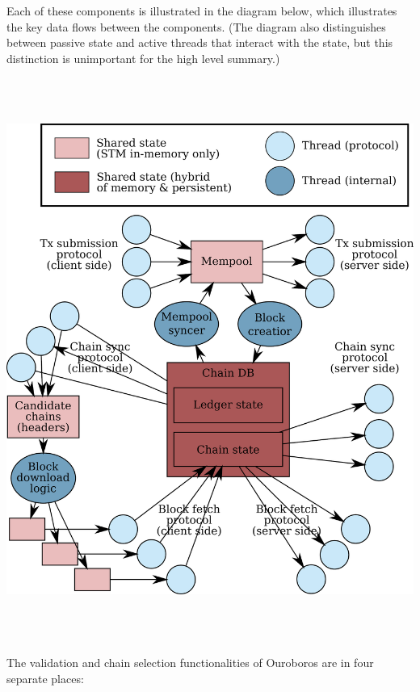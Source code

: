 \documentclass[]{article}
\begin{document}
Each of these components is illustrated in the diagram below, which
illustrates the key data flows between the components. (The diagram also
distinguishes between passive state and active threads that interact
with the state, but this distinction is unimportant for the high level
summary.)

\includegraphics[width=6.27083in,height=7.25347in]{./media/image8.png}

The validation and chain selection functionalities of Ouroboros are in
four separate places:
\end{document}
